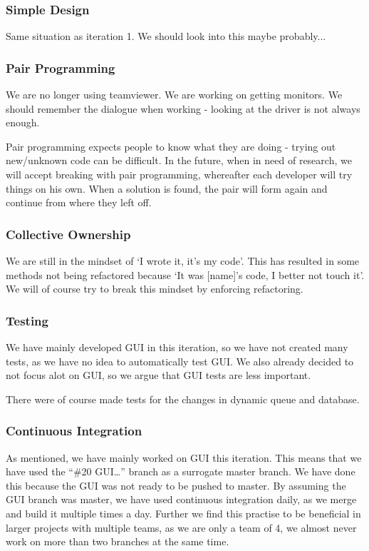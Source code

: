 \subsubsection{Simple Design}
Same situation as iteration 1. We should look into this maybe probably...

\subsubsection{Pair Programming}
We are no longer using teamviewer. We are working on getting monitors.
We should remember the dialogue when working - looking at the driver is not always enough.

Pair programming expects people to know what they are doing - trying out new/unknown code can be difficult. In the future, when in need of research, we will accept breaking with pair programming, whereafter each developer will try things on his own. When a solution is found, the pair will form again and continue from where they left off.

\subsubsection{Collective Ownership}
We are still in the mindset of `I wrote it, it’s my code'. This has resulted in some methods not being refactored because `It was [name]’s code, I better not touch it'. We will of course try to break this mindset by enforcing refactoring.

\subsubsection{Testing}
We have mainly developed GUI in this iteration, so we have not created many tests, as we have no idea to automatically test GUI. We also already decided to not focus alot on GUI, so we argue that GUI tests are less important.

There were of course made tests for the changes in dynamic queue and database.

\subsubsection{Continuous Integration}
As mentioned, we have mainly worked on GUI this iteration. This means that we have used the ``\#20 GUI…'' branch as a surrogate master branch. We have done this because the GUI was not ready to be pushed to master. By assuming the GUI branch was master, we have used continuous integration daily, as we merge and build it multiple times a day.
Further we find this practise to be beneficial in larger projects with multiple teams, as we are only a team of 4, we almost never work on more than two branches at the same time. 
